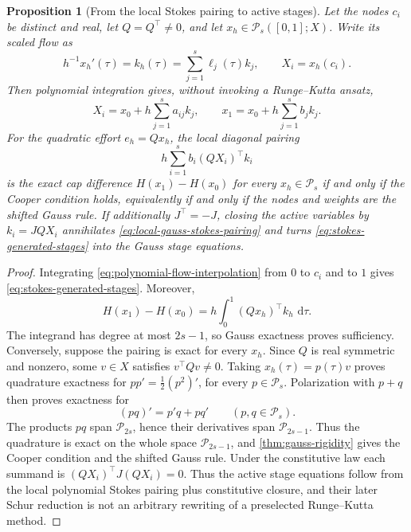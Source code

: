 \documentclass[11pt,a4paper]{article}
\newtheorem{proposition}[theorem]{Proposition}
\newcommand{\dd}{\,\mathrm d}
\begin{document}
\begin{proposition}[From the local Stokes pairing to active stages]
\label{prop:local-stokes-to-stages}
Let the nodes \(c_i\) be distinct and real, let
\(Q=Q^\top\ne0\), and let
\(x_h\in\mathcal P_s([0,1];X)\).  Write its scaled flow as
\begin{equation}\label{eq:polynomial-flow-interpolation}
 h^{-1}x_h'(\tau)=k_h(\tau)
 =\sum_{j=1}^s\ell_j(\tau)k_j,
 \qquad X_i=x_h(c_i).
\end{equation}
Then polynomial integration gives, without invoking a Runge--Kutta
ansatz,
\begin{equation}\label{eq:stokes-generated-stages}
 X_i=x_0+h\sum_{j=1}^sa_{ij}k_j,\qquad
 x_1=x_0+h\sum_{j=1}^sb_jk_j.
\end{equation}
For the quadratic effort \(e_h=Qx_h\), the local diagonal pairing
\begin{equation}\label{eq:local-gauss-stokes-pairing}
 h\sum_{i=1}^sb_i(QX_i)^\top k_i
\end{equation}
is the exact cap difference
\(H(x_1)-H(x_0)\) for every \(x_h\in\mathcal P_s\) if and only if the
Cooper condition holds, equivalently if and only if the nodes and weights
are the shifted Gauss rule.  If additionally \(J^\top=-J\), closing the
active variables by \(k_i=JQX_i\) annihilates
\cref{eq:local-gauss-stokes-pairing} and turns
\cref{eq:stokes-generated-stages} into the Gauss stage equations.
\end{proposition}

\begin{proof}
Integrating \cref{eq:polynomial-flow-interpolation} from \(0\) to
\(c_i\) and to \(1\) gives \cref{eq:stokes-generated-stages}.  Moreover,
\[
 H(x_1)-H(x_0)
 =h\int_0^1(Qx_h)^\top k_h\,\dd\tau .
\]
The integrand has degree at most \(2s-1\), so Gauss exactness proves
sufficiency.  Conversely, suppose the pairing is exact for every
\(x_h\).  Since \(Q\) is real symmetric and nonzero, some \(v\in X\)
satisfies \(v^\top Qv\ne0\).  Taking \(x_h(\tau)=p(\tau)v\) proves
quadrature exactness for \(pp'=\tfrac12(p^2)'\), for every
\(p\in\mathcal P_s\).  Polarization with \(p+q\) then proves exactness
for
\[
 (pq)'=p'q+pq'\qquad(p,q\in\mathcal P_s).
\]
The products \(pq\) span \(\mathcal P_{2s}\), hence their derivatives
span \(\mathcal P_{2s-1}\).  Thus the quadrature is exact on the whole
space \(\mathcal P_{2s-1}\), and \cref{thm:gauss-rigidity} gives the
Cooper condition and the shifted Gauss rule.  Under the constitutive law
each summand is
\((QX_i)^\top J(QX_i)=0\).  Thus the active stage equations follow from
the local polynomial Stokes pairing plus constitutive closure, and their
later Schur reduction is not an arbitrary rewriting of a preselected
Runge--Kutta method.
\end{proof}
\end{document}
